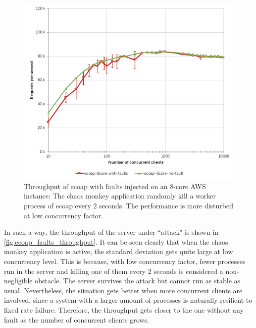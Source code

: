 \begin{figure}[!htbp]
\centering
\includegraphics[scale=0.7]{ecoap_faults_throughput}
\caption[Throughput of ecoap with faults injected on an 8-core AWS instance]{Throughput of ecoap with faults injected on an 8-core AWS instance: The chaos monkey application randomly kill a worker process of ecoap every 2 seconds. The performance is more disturbed at low concurrency factor.}
\label{fig:ecoap_faults_throughput}
\end{figure}

In such a way, the throughput of the server under ``attack" is shown in \autoref{fig:ecoap_faults_throughput}. It can be seen clearly that when the chaos monkey application is active, the standard deviation gets quite large at low concurrency level. This is because, with low concurrency factor, fewer processes run in the server and killing one of them every 2 seconds is considered a non-negligible obstacle. The server survives the attack but cannot run as stable as usual. Nevertheless, the situation gets better when more concurrent clients are involved, since a system with a larger amount of processes is naturally resilient to fixed rate failure. Therefore, the throughput gets closer to the one without any fault as the number of concurrent clients grows. 

